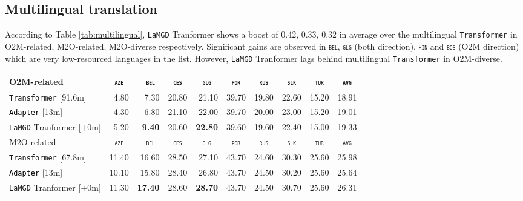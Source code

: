 \documentclass[11pt]{article}
\newcommand{\revision}[1]{\textcolor{black}{#1}}
\newcommand{\domain}[1]{\texttt{\textsc{#1}}}
\newcommand{\system}[1]{\texttt{{#1}}}
\newcommand{\SB}[1]{\textbf{#1}}
\begin{document}
\subsection{Multilingual translation}
According to Table \ref{tab:multilingual}, \system{LaMGD} Tranformer shows a boost of 0.42, 0.33, 0.32 in average over the multilingual \system{Transformer} in O2M-related, M2O-related, M2O-diverse respectively. Significant gains are observed in \domain{bel}, \domain{glg} (both direction), \domain{hin} and \domain{bos} (O2M direction) which are very low-resourced languages in the list. However, \system{LaMGD} Tranformer lags behind multilingual \system{Transformer} in O2M-diverse. 
\begin{table}[h!]
  \centering
  \begin{tabular}{|p{4cm}|*{9}{r|}} \hline
    O2M-related & \multicolumn{1}{c|}{\domain{aze}} & \multicolumn{1}{c|}{\domain{ bel}} & \multicolumn{1}{c|}{\domain{ces}} & \multicolumn{1}{c|}{\domain{glg}} & \multicolumn{1}{c|}{\domain{por}} & \multicolumn{1}{c|}{\domain{rus}} & \multicolumn{1}{c|}{\domain{slk}} & \multicolumn{1}{c|}{\domain{tur}} & \multicolumn{1}{c|}{\domain{avg}} \\ \hline 
    \system{Transformer}  \hfill{\footnotesize[91.6m]} & 4.80 &7.30&20.80&21.10&39.70&19.80&22.60&15.20&18.91 \\
    \revision{\system{Adapter}}   \hfill{\footnotesize[13m]} &4.30&6.80&21.10&22.00&39.70&20.00&23.00&15.20&19.01 \\ 
    \system{LaMGD} Tranformer  \hfill{\footnotesize[+0m]}  & 5.20&\SB{9.40}&20.60&\SB{22.80}&39.60&19.60&22.40&15.00&19.33 \\ 
	\hline
    \hline
    M2O-related & \multicolumn{1}{c|}{\domain{aze}} & \multicolumn{1}{c|}{\domain{ bel}} & \multicolumn{1}{c|}{\domain{ces}} & \multicolumn{1}{c|}{\domain{glg}} & \multicolumn{1}{c|}{\domain{por}} & \multicolumn{1}{c|}{\domain{rus}} & \multicolumn{1}{c|}{\domain{slk}} & \multicolumn{1}{c|}{\domain{tur}} & \multicolumn{1}{c|}{\domain{avg}} \\ \hline 
    \system{Transformer}  \hfill{\footnotesize[67.8m]} &11.40&16.60&28.50&	27.10&43.70&24.60&30.30&25.60&25.98 \\
    \revision{\system{Adapter}}   \hfill{\footnotesize[13m]} &10.10&15.80&28.40&26.80&43.70&24.50&30.20&25.60&25.64\\ 
    \system{LaMGD} Tranformer   \hfill{\footnotesize[+0m]}  &11.30&\SB{17.40}&28.60&\SB{28.70}&43.70&24.50&30.70&25.60&26.31 \\ 

\end{tabular}
\end{table}
\end{document}
